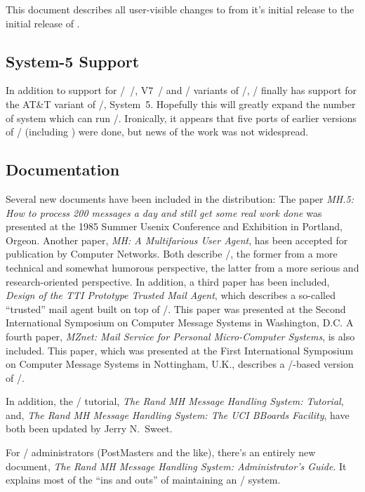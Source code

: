 This document describes all user-visible changes to  from it's initial
release to the initial release of .

\subsection*	{System-5 Support}
In addition to support for \bsd/~\unix/, V7~\unix/ and \xenix/ variants of
\unix/,
\MH/ finally has support for the AT\&T variant of \unix/, System~5.
Hopefully this will greatly expand the number of system which can run \MH/.
Ironically,
it appears that five ports of earlier versions of \MH/ (including )
were done,
but news of the work was not widespread.%

\subsection*	{Documentation}
Several new documents have been included in the  distribution:
The paper {\em MH.5: How to process 200 messages a day and still get some
real work done}
was presented at the 1985 Summer Usenix Conference and Exhibition in
Portland, Orgeon.
Another paper, {\em MH: A Multifarious User Agent},
has been accepted for publication by Computer Networks.
Both describe \MH/,
the former from a more technical and somewhat humorous perspective,
the latter from a more serious and research-oriented perspective.
In addition,
a third paper has been included,
{\em Design of the TTI Prototype Trusted Mail Agent},
which describes a so-called ``trusted'' mail agent built on top of \MH/.
This paper was presented at the Second International Symposium on
Computer Message Systems in Washington, D.C.
A fourth paper,
{\em MZnet: Mail Service for Personal Micro-Computer Systems},
is also included.
This paper,
which was presented at the First International Symposium on Computer Message
Systems in Nottingham, U.K.,
describes a \cpm/-based version of \MH/.

In addition,
the \MH/ tutorial, {\em The Rand MH Message Handling System: Tutorial},
and,
{\em The Rand MH Message Handling System: The UCI BBoards Facility},
have both been updated by Jerry N.~Sweet.

For \MH/ administrators (PostMasters and the like),
there's an entirely new document,
{\em The Rand MH Message Handling System: Administrator's Guide}.
It explains most of the ``ins and outs'' of maintaining an \MH/ system.

